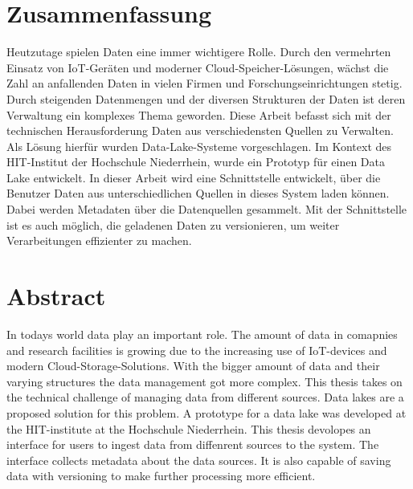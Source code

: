 \section*{Zusammenfassung}

Heutzutage spielen Daten eine immer wichtigere Rolle.
Durch den vermehrten Einsatz von IoT-Geräten und moderner Cloud-Speicher-Lösungen, wächst die Zahl an anfallenden Daten in vielen Firmen und Forschungseinrichtungen stetig.
Durch steigenden Datenmengen und der diversen Strukturen der Daten ist deren Verwaltung ein komplexes Thema geworden.
Diese Arbeit befasst sich mit der technischen Herausforderung Daten aus verschiedensten Quellen zu Verwalten.
Als Lösung hierfür wurden Data-Lake-Systeme vorgeschlagen.
Im Kontext des HIT-Institut der Hochschule Niederrhein, wurde ein Prototyp für einen Data Lake entwickelt.
In dieser Arbeit wird eine Schnittstelle entwickelt, über die Benutzer Daten aus unterschiedlichen Quellen in dieses System laden können.
Dabei werden Metadaten über die Datenquellen gesammelt.
Mit der Schnittstelle ist es auch möglich, die geladenen Daten zu versionieren, um weiter Verarbeitungen effizienter zu machen.

\section*{Abstract}

In todays world data play an important role.
The amount of data in comapnies and research facilities is growing due to the increasing use of IoT-devices and modern Cloud-Storage-Solutions.
With the bigger amount of data and their varying structures the data management got more complex.
This thesis takes on the technical challenge of managing data from different sources.
Data lakes are a proposed solution for this problem.
A prototype for a data lake was developed at the HIT-institute at the Hochschule Niederrhein.
This thesis devolopes an interface for users to ingest data from diffenrent sources to the system.
The interface collects metadata about the data sources.
It is also capable of saving data with versioning to make further processing more efficient.